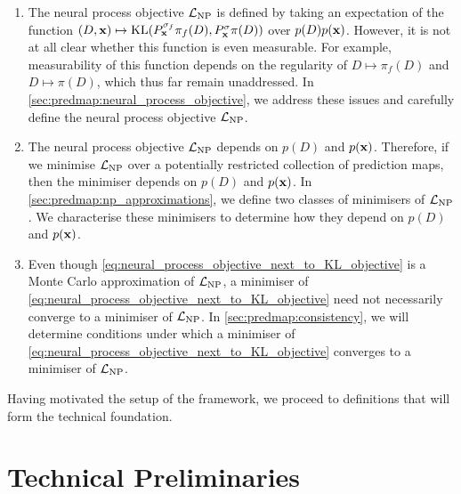 \documentclass[12pt, twoside]{report}
\begin{document}
\begin{enumerate}
    \item
        The neural process objective $\L\ss{NP}$ is defined by taking an expectation of the function
        $(D, \mathbf{x}) \mapsto \operatorname{KL}(P^{\sigma_f}_{\mathbf{x}} \pi_f(D), P^{\sigma}_{\mathbf{x}} \pi(D))$
        over $p(D)p(\mathbf{x})$.
        However, it is not at all clear whether this function is even measurable.
        For example, measurability of this function depends on the regularity of $D \mapsto \pi_f(D)$ and $D \mapsto \pi(D)$, which thus far remain unaddressed.
        In \cref{sec:predmap:neural_process_objective},
        we address these issues and carefully define the neural process objective $\L\ss{NP}$.
    \item 
        The neural process objective $\L\ss{NP}$ depends on $p(D)$ and $p(\mathbf{x})$.
        Therefore, if we minimise $\L\ss{NP}$ over a potentially restricted collection of prediction maps,
        then the minimiser depends on $p(D)$ and $p(\mathbf{x})$.
        In \cref{sec:predmap:np_approximations}, we define two classes of minimisers of $\L\ss{NP}$.
        We characterise these minimisers to determine how they depend on $p(D)$ and $p(\mathbf{x})$.
    \item 
        Even though \eqref{eq:neural_process_objective_next_to_KL_objective} is a Monte Carlo approximation of $\L\ss{NP}$, a minimiser of \eqref{eq:neural_process_objective_next_to_KL_objective} need not necessarily converge to a minimiser of $\L\ss{NP}$.
        In \cref{sec:predmap:consistency}, we will determine conditions under which a minimiser of \eqref{eq:neural_process_objective_next_to_KL_objective} converges to a minimiser of $\L\ss{NP}$.
\end{enumerate}

Having motivated the setup of the framework, we proceed to definitions that will form the technical foundation.

\section{Technical Preliminaries}
\label{sec:predmap:prelims}
\end{document}
